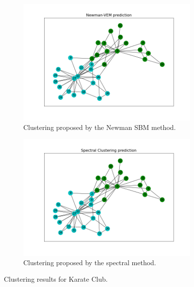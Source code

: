 \documentclass[switch, 12pt]{article}
\begin{document}
\begin{figure}[h]
    \medskip

    \begin{subfigure}{0.42\linewidth}
        \centering
        \includegraphics[width=\linewidth, trim={45 35 35 60}, clip]{figures/karate_club_newman.png}
        \caption{Clustering proposed by the Newman SBM method.}
        \label{fig:zachary_newman}
    \end{subfigure}
    \hspace{1em}
    \begin{subfigure}{0.42\linewidth}
        \centering
        \includegraphics[width=\linewidth, trim={45 35 35 60}, clip]{figures/karate_club_spectral.png}
        \caption{Clustering proposed by the spectral method.}
        \label{fig:zachary_spectral}
    \end{subfigure}
    \caption{Clustering results for Karate Club.}
    \label{fig:zachary_results}
\end{figure}
\end{document}
